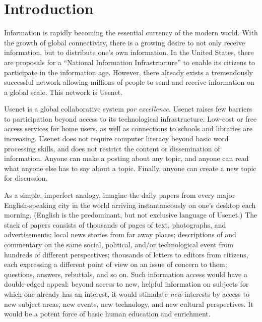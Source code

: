 
\section {Introduction}
\label{sec:introduction}
  
Information is rapidly becoming the essential currency of the modern world.
With the growth of global connectivity, there is a growing desire to not only
receive information, but to distribute one's own information. In the United
States, there are proposals for a ``National Information Infrastructure''
\cite{nii-agenda} to enable its citizens to participate in the information age.
However, there already exists a tremendously successful network allowing
millions of people to send and receive information on a global scale.  This
network is Usenet.

Usenet is a global collaborative system {\em par excellence}.  Usenet
raises few barriers to participation beyond access to its technological
infrastructure. Low-cost or free access services for home users, as well as
connections to schools and libraries are increasing.  Usenet does not
require computer literacy beyond basic word processing skills, and does not
restrict the content or dissemination of information.  Anyone can make a
posting about any topic, and anyone can read what anyone else has to say
about a topic.  Finally, anyone can create a new topic for discussion.

As a simple, imperfect analogy, imagine the daily papers from every major
English-speaking city in the world arriving instantaneously on one's desktop
each morning. (English is the predominant, but not exclusive language of
Usenet.)  The stack of papers consists of thousands of pages of text,
photographs, and advertisements; local news stories from far away places;
descriptions of and commentary on the same social, political, and/or
technological event from hundreds of different perspectives; thousands of
letters to editors from citizens, each expressing a different point of view on
an issue of concern to them; questions, answers, rebuttals, and so on.  Such
information access would have a double-edged appeal: beyond access to new,
helpful information on subjects for which one already has an interest, it would
stimulate {\em new} interests by access to new subject areas, new events, new
technology, and new cultural perspectives.  It would be a potent force of basic
human education and enrichment.

